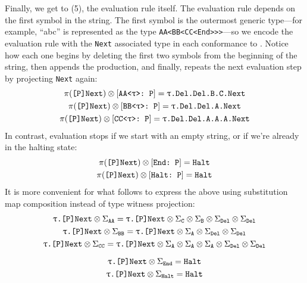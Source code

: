 \documentclass[../generics]{subfiles}
\begin{document}
Finally, we get to (5), the evaluation rule itself. The evaluation rule depends on the first symbol in the string. The first symbol is the outermost generic type---for example, ``abc'' is represented as the type \texttt{AA<BB<CC<End>>>}---so we encode the evaluation rule with the \texttt{Next} associated type in each conformance to \tP. Notice how each one begins by deleting the first two symbols from the beginning of the string, then appends the production, and finally, repeats the next evaluation step by projecting \texttt{Next} again:
\begin{gather*}
\pi(\texttt{[P]Next}) \otimes [\texttt{AA<$\uptau$>:~P}] = \texttt{$\uptau$.Del.Del.B.C.Next}\\
\pi(\texttt{[P]Next}) \otimes [\texttt{BB<$\uptau$>:~P}] = \texttt{$\uptau$.Del.Del.A.Next}\\
\pi(\texttt{[P]Next}) \otimes [\texttt{CC<$\uptau$>:~P}] = \texttt{$\uptau$.Del.Del.A.A.A.Next}
\end{gather*}
In contrast, evaluation stops if we start with an empty string, or if we're already in the halting state:
\begin{gather*}
\pi(\texttt{[P]Next}) \otimes [\texttt{End:~P}] = \texttt{Halt}\\
\pi(\texttt{[P]Next}) \otimes [\texttt{Halt:~P}] = \texttt{Halt}
\end{gather*}
It is more convenient for what follows to express the above using substitution map composition instead of type witness projection:
\begin{gather*}
\texttt{$\uptau$.[P]Next} \otimes \Sigma_{\texttt{AA}} = \texttt{$\uptau$.[P]Next} \otimes \Sigma_{\texttt{C}} \otimes \Sigma_{\texttt{B}} \otimes \Sigma_{\texttt{Del}} \otimes \Sigma_{\texttt{Del}}\\
\texttt{$\uptau$.[P]Next} \otimes \Sigma_{\texttt{BB}} = \texttt{$\uptau$.[P]Next} \otimes \Sigma_{\texttt{A}} \otimes \Sigma_{\texttt{Del}} \otimes \Sigma_{\texttt{Del}}\\
\texttt{$\uptau$.[P]Next} \otimes \Sigma_{\texttt{CC}} = \texttt{$\uptau$.[P]Next} \otimes \Sigma_{\texttt{A}} \otimes \Sigma_{\texttt{A}} \otimes \Sigma_{\texttt{A}} \otimes \Sigma_{\texttt{Del}} \otimes \Sigma_{\texttt{Del}}\\[\medskipamount]
\texttt{$\uptau$.[P]Next} \otimes \Sigma_{\texttt{End}} = \texttt{Halt}\\
\texttt{$\uptau$.[P]Next} \otimes \Sigma_{\texttt{Halt}} = \texttt{Halt}
\end{gather*}
\end{document}
